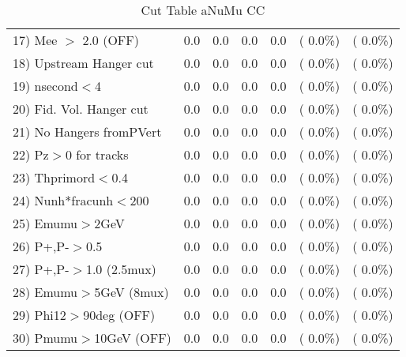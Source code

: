 \begin{table}[h!]
\begin{tabular}{||l||r|r|r|r|r|r||}
 17) Mee $>$ 2.0  (OFF)   &          0.0 &          0.0 &          0.0 &          0.0 & (  0.0\%) & (  0.0\%) \\
 18) Upstream Hanger cut  &          0.0 &          0.0 &          0.0 &          0.0 & (  0.0\%) & (  0.0\%) \\
 19) nsecond$<$4          &          0.0 &          0.0 &          0.0 &          0.0 & (  0.0\%) & (  0.0\%) \\
 20) Fid. Vol. Hanger cut &          0.0 &          0.0 &          0.0 &          0.0 & (  0.0\%) & (  0.0\%) \\
 21) No Hangers fromPVert &          0.0 &          0.0 &          0.0 &          0.0 & (  0.0\%) & (  0.0\%) \\
 22) Pz$>$0 for tracks    &          0.0 &          0.0 &          0.0 &          0.0 & (  0.0\%) & (  0.0\%) \\
 23) Thprimord$<$0.4      &          0.0 &          0.0 &          0.0 &          0.0 & (  0.0\%) & (  0.0\%) \\
 24) Nunh*fracunh$<$200   &          0.0 &          0.0 &          0.0 &          0.0 & (  0.0\%) & (  0.0\%) \\
 25) Emumu$>$2GeV         &          0.0 &          0.0 &          0.0 &          0.0 & (  0.0\%) & (  0.0\%) \\
 26) P+,P-$>$0.5          &          0.0 &          0.0 &          0.0 &          0.0 & (  0.0\%) & (  0.0\%) \\
 27) P+,P-$>$1.0 (2.5mux) &          0.0 &          0.0 &          0.0 &          0.0 & (  0.0\%) & (  0.0\%) \\
 28) Emumu$>$5GeV  (8mux) &          0.0 &          0.0 &          0.0 &          0.0 & (  0.0\%) & (  0.0\%) \\
 29) Phi12$>$90deg  (OFF) &          0.0 &          0.0 &          0.0 &          0.0 & (  0.0\%) & (  0.0\%) \\
 30) Pmumu$>$10GeV  (OFF) &          0.0 &          0.0 &          0.0 &          0.0 & (  0.0\%) & (  0.0\%) \\
 \hline
 \hline
 \end{tabular}
 \caption{Cut Table  aNuMu CC }
 \label{tab-cutcohjpsi-mumu_res}
 \end{table}
